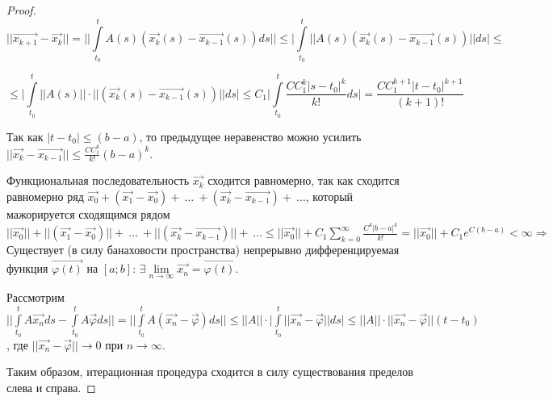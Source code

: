\begin{proof}
\[ || \overrightarrow{x_{k+1}} - \overrightarrow{x_{k}} || = \Big| \Big| \int\limits_{t_0}^{t} A(s)(\overrightarrow{x_k}(s) - \overrightarrow{x_{k-1}}(s))ds \Big| \Big| \leqslant \Big| \int\limits_{t_0}^{t} ||A(s)(\overrightarrow{x_k}(s) - \overrightarrow{x_{k-1}}(s))|| ds \Big| \leqslant \]

\[ \leqslant \Big| \int\limits_{t_0}^{t} ||A(s)||\cdot ||(\overrightarrow{x_k}(s) - \overrightarrow{x_{k-1}}(s))|| ds \Big| \leqslant C_1 \Big| \int\limits_{t_0}^{t} \frac{CC_1^k|s-t_0|^k}{k!}ds \Big| = \frac{CC_1^{k+1}|t-t_0|^{k+1}}{(k+1)!} \]

Так как $|t-t_0| \leqslant (b-a)$, то предыдущее неравенство можно усилить $||\overrightarrow{x_k} - \overrightarrow{x_{k-1}}|| \leqslant \frac{CC_1^k}{k!}(b-a)^k.$

Функциональная последовательность $\overrightarrow{x_k}$ сходится равномерно, так как сходится равномерно ряд $\overrightarrow{x_0} + (\overrightarrow{x_1} - \overrightarrow{x_0}) +\ \dots\ +(\overrightarrow{x_k} - \overrightarrow{x_{k-1}}) +\ \dots$, который мажорируется сходящимся рядом $||\overrightarrow{x_0}|| + ||(\overrightarrow{x_1} - \overrightarrow{x_0})|| +\ \dots\ + ||(\overrightarrow{x_k} - \overrightarrow{x_{k-1}})|| +\ \dots \leqslant ||\overrightarrow{x_0}|| + C_1\sum\limits_{k = 0}^{\infty}\frac{C^k|b-a|^k}{k!} = ||\overrightarrow{x_0}|| + C_1 e^{C(b-a)} < \infty \Rightarrow$ Существует (в силу банаховости пространства) непрерывно дифференцируемая функция $\overrightarrow{\varphi(t)}$ на $[a;b]$: $\exists \lim\limits_{n \rightarrow \infty} \overrightarrow{x_n} = \overrightarrow{\varphi(t)}.$

Рассмотрим $\Big| \Big| \int\limits_{t_0}^{t} A\overrightarrow{x_n}ds - \int\limits_{t_0}^{t} A\overrightarrow{\varphi} ds \Big| \Big| = \Big| \Big| \int\limits_{t_0}^{t} A(\overrightarrow{x_n} - \overrightarrow{\varphi})ds \Big| \Big| \leqslant ||A||\cdot \Big| \int\limits_{t_0}^{t} ||\overrightarrow{x_n} - \overrightarrow{\varphi}|| ds \Big| \leqslant ||A|| \cdot ||\overrightarrow{x_n} - \overrightarrow{\varphi}|| (t - t_0)$, где $||\overrightarrow{x_n} - \overrightarrow{\varphi} || \rightarrow 0$ при $n \rightarrow \infty$.

Таким образом, итерационная процедура сходится в силу существования пределов слева и справа.


\end{proof}
